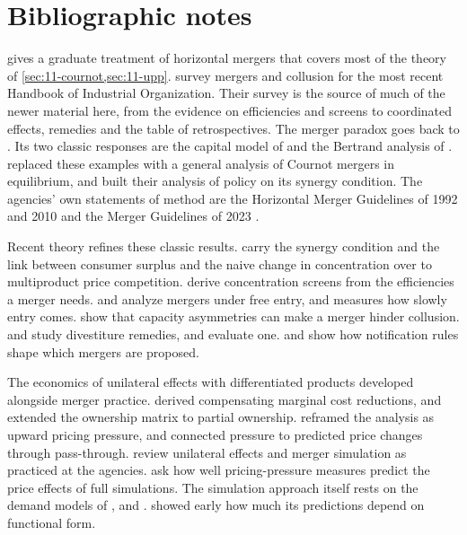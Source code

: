 





\section{Bibliographic notes}\label{sec:11-bibnotes}

\citet[ch.~3]{Whinston2006} gives a graduate treatment of horizontal mergers that covers most of the theory of
\cref{sec:11-cournot,sec:11-upp}. \citet{AskerNocke2021} survey mergers and collusion for the most recent Handbook of
Industrial Organization. Their survey is the source of much of the newer material here, from the evidence on
efficiencies and screens to coordinated effects, remedies and the table of retrospectives. The merger paradox goes back to \citet{SalantSwitzerReynolds1983}. Its two
classic responses are the capital model of \citet{PerryPorter1985} and the Bertrand analysis of
\citet{DeneckereDavidson1985}. \citet{FarrellShapiro1990} replaced these examples with a general analysis of
Cournot mergers in equilibrium, and \citet{NockeWhinston2013} built their analysis of policy on its synergy condition. The
agencies' own statements of method are the Horizontal Merger Guidelines of 1992 and 2010 and the Merger Guidelines
of 2023 \citep{USDOJFTC1992,USDOJFTC2010,USDOJFTC2023}.

Recent theory refines these classic results. \citet{NockeSchutz2018,NockeSchutz2019} carry the synergy condition and
the link between consumer surplus and the naive change in concentration over to multiproduct price competition.
\citet{NockeWhinston2020} derive concentration screens from the efficiencies a merger needs. \citet{Spector2003} and
\citet{DavidsonMukherjee2007} analyze mergers under free entry, and \citet{CollardWexler2014} measures how slowly entry
comes. \citet{CompteJennyRey2002} show that capacity asymmetries can make a merger hinder collusion. \citet{Verge2010}
and \citet{NockeRhodes2019} study divestiture remedies, and \citet{FribergRomahn2015} evaluate one.
\citet{BesankoSpulber1993} and \citet{Wollmann2019} show how notification rules shape which mergers are proposed.

The economics of unilateral effects with differentiated products developed alongside merger practice.
\citet{Werden1996} derived compensating marginal cost reductions, and \citet{OBrienSalop2000} extended the
ownership matrix to partial ownership. \citet{FarrellShapiro2010} reframed the analysis as upward pricing pressure,
and \citet{JaffeWeyl2013} connected pressure to predicted price changes through pass-through. \citet{WerdenFroeb2008}
review unilateral effects and merger simulation as practiced at the agencies. \citet{MillerEtAl2017} ask how well
pricing-pressure measures predict the price effects of full simulations. The simulation approach itself rests on
the demand models of \citet{HausmanLeonardZona1994}, \citet{WerdenFroeb1994} and \citet{Nevo2000b}.
\citet{CrookeEtAl1999} showed early how much its predictions depend on functional form.

